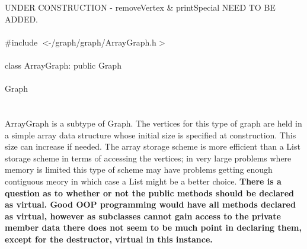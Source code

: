 
UNDER CONSTRUCTION - removeVertex \& printSpecial NEED TO BE ADDED. \\

   \\
\indent \#include $<\tilde{ }$/graph/graph/ArrayGraph.h$>$  \\

  \\
\indent class ArrayGraph: public Graph \\

 \\
\indent Graph \\
\indent{} \\

  \\
\indent ArrayGraph is a subtype of Graph. The vertices for this type
of graph are held in a simple array data structure whose initial size
is specified at construction. This size can increase if
needed. The array storage scheme is more efficient than a List storage
scheme in terms of accessing the vertices; in very large problems
where memory is limited this type of scheme may have problems getting
enough contiguous meory in which case a List might be a better
choice. {\bf There is a question as to whether or not the public
methods should be declared as virtual. Good OOP programming would have
all methods declared as virtual, however as subclasses cannot gain
access to the private member data there does not seem to be much point
in declaring them, except for the destructor, virtual in this
instance.} \\ 


